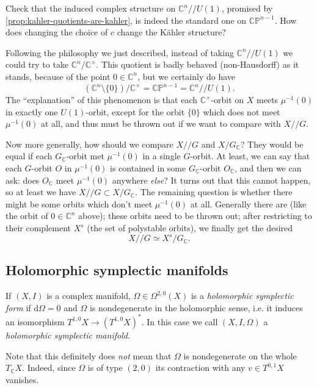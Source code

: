 \documentclass[12pt,letterpaper,reqno]{article}
\numberwithin{equation}{section}
\newcommand{\C}{\ensuremath{\mathbb C}}
\newcommand{\PP}{\ensuremath{\mathbb P}}
\newcommand{\kahler}{K\"ahler\xspace}
\newcommand{\kq}{/\!\!/}
\newcommand{\de}{\mathrm{d}}
\newcommand{\ti}[1]{\textit{#1}}
\begin{document}
\begin{exercise}
Check that the induced complex structure on $\C^n \kq U(1)$,
promised by \autoref{prop:kahler-quotients-are-kahler}, is indeed
the standard one on $\C\PP^{n-1}$. How does changing
the choice of $c$ change the \kahler structure?
\end{exercise}

Following the philosophy we just described, instead of taking
$\C^n \kq U(1)$ we could try to take $\C^n / \C^\times$.
This quotient is badly behaved (non-Hausdorff) as it stands, because of the
point $0 \in \C^n$, but we certainly do have
\begin{equation}
  (\C^n \setminus \{0\}) / \C^\times = \C\PP^{n-1} = \C^n \kq U(1).
\end{equation}
The ``explanation'' of this phenomenon is that each
$\C^\times$-orbit on $X$ meets $\mu^{-1}(0)$ in
exactly one $U(1)$-orbit,
except for the orbit $\{0\}$ which does not
meet $\mu^{-1}(0)$ at all, and thus must be thrown out
if we want to compare with $X \kq G$.

Now more generally, how should we compare $X \kq G$ and $X / G_\C$?
They would be equal if each $G_\C$-orbit met $\mu^{-1}(0)$
in a single $G$-orbit. At least, we can say that
each $G$-orbit $O$ in $\mu^{-1}(0)$ is contained in some $G_\C$-orbit $O_\C$,
and then we can ask: does $O_\C$ meet $\mu^{-1}(0)$ anywhere \ti{else}?
It turns out that this cannot happen, so at least we have
$X \kq G \subset X / G_\C$. The remaining question is whether there might
be some orbits which don't meet $\mu^{-1}(0)$ at all. Generally there are
(like the orbit of $0 \in \C^n$ above);
these orbits need to be
thrown out; after restricting to their complement $X^s$ (the set of polystable
orbits), we finally get the desired
\begin{equation}
  X \kq G \simeq X^s / G_\C.
\end{equation}


\subsection{Holomorphic symplectic manifolds}

\begin{defn} If $(X,I)$ is a complex manifold,
$\Omega \in \Omega^{2,0}(X)$ is a \ti{holomorphic
symplectic form} if $\de \Omega = 0$
and $\Omega$ is nondegenerate
in the holomorphic sense, i.e. it induces
an isomorphism $T^{1,0}X \to (T^{1,0} X)^*$.
In this case we call $(X,I,\Omega)$ a \ti{holomorphic symplectic
manifold}.
\end{defn}
Note that this definitely does \ti{not} mean that $\Omega$ is nondegenerate on the whole $T_\C X$. Indeed, since $\Omega$ is
of type $(2,0)$ its contraction with any $v \in T^{0,1} X$ vanishes.
\end{document}
